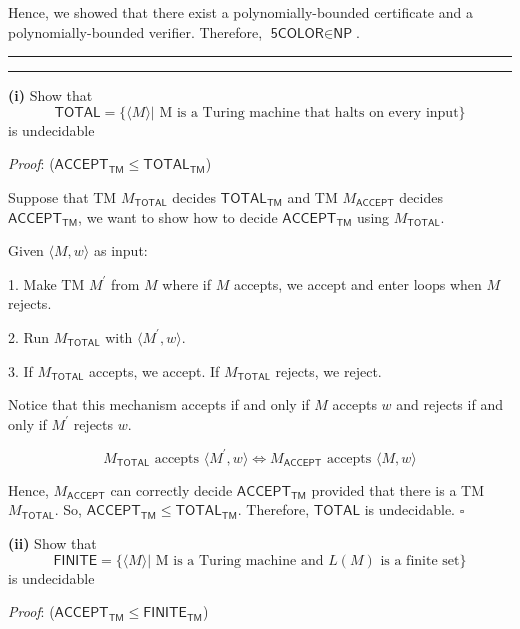 \documentclass[a4paper, 11pt]{article}
\newcommand{\question}[2] {\vspace{.25in} \hrule\vspace{0.5em}
	\noindent{\bf #1: #2} \vspace{0.5em}
	\hrule \vspace{.10in}}
\renewcommand{\part}[1] {\vspace{.10in} {\bf (#1)}}
\begin{document}
	Hence, we showed that there exist a polynomially-bounded certificate and a polynomially-bounded verifier. Therefore, $\textsf{5COLOR} \in \textsf{NP}$.
	
	
		
	\question{4}{NP-Complete}
	
	\part{i} Show that 
	$$ \textsf{TOTAL} = \{\langle M \rangle | \text{ M is a Turing machine that halts on every input} \} $$ is undecidable


	{\em Proof}:  ($\textsf{ACCEPT}_{\textsf{TM}} \leq \textsf{TOTAL}_{\textsf{TM}} $)
	
	Suppose that TM $M_{\textsf{TOTAL}}$ decides $\textsf{TOTAL}_{\textsf{TM}}$ and TM $M_{\textsf{ACCEPT}}$ decides $\textsf{ACCEPT}_{\textsf{TM}}$, we want to show how to decide $\textsf{ACCEPT}_{\textsf{TM}}$ using $M_{\textsf{TOTAL}}$.
	
	Given $\langle M, w \rangle$ as input:
	
	1. Make TM $M^\prime$ from $M$ where if $M$ accepts, we accept and enter loops when $M$ rejects.
	
	2. Run $M_{\textsf{TOTAL}}$ with $\langle M^\prime, w \rangle$.
	
	3. If $M_{\textsf{TOTAL}}$ accepts, we accept. If $M_{\textsf{TOTAL}}$ rejects, we reject.
	
	Notice that this mechanism accepts if and only if $M$ accepts $w$ and rejects if and only if $M^\prime$ rejects $w$. 
	
	$$ M_{\textsf{TOTAL}} \text{ accepts }\langle M^\prime,w \rangle \iff M_{\textsf{ACCEPT}} \text{ accepts } \langle M,w\rangle $$
	
	Hence, $M_{\textsf{ACCEPT}}$ can correctly decide $\textsf{ACCEPT}_{\textsf{TM}}$ provided that there is a TM $M_{\textsf{TOTAL}}$. So, $\textsf{ACCEPT}_{\textsf{TM}} \leq \textsf{TOTAL}_{\textsf{TM}} $. Therefore, $\textsf{TOTAL}$ is undecidable. $\square$

	
	\part{ii} Show that 
	$$ \textsf{FINITE} = \{\langle M \rangle | \text{ M is a Turing machine and $L(M)$ is a finite set} \} $$ is undecidable

	{\em Proof}: ($\textsf{ACCEPT}_{\textsf{TM}} \leq \textsf{FINITE}_{\textsf{TM}} $)
	
\end{document}
